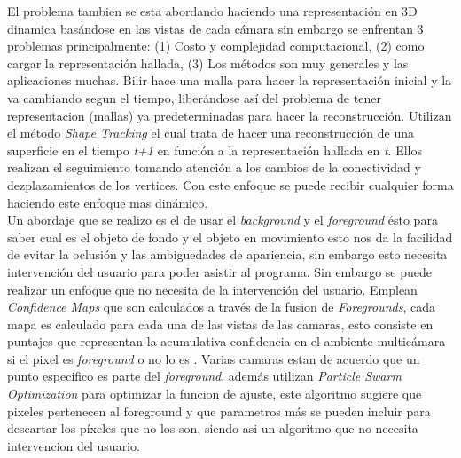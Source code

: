 El problema tambien se esta abordando haciendo una representaci\'on en 3D dinamica bas\'andose en las vistas de cada c\'amara sin embargo se enfrentan 3 problemas principalmente: (1) Costo y complejidad computacional, (2) como cargar la representaci\'on hallada, (3) Los m\'etodos son muy generales y las aplicaciones muchas. Bilir hace una malla para hacer la representaci\'on inicial y la va cambiando segun el tiempo, liber\'andose as\'i del problema de tener representacion (mallas) ya predeterminadas para hacer la reconstrucci\'on. Utilizan el m\'etodo \textit{Shape Tracking} el cual trata de hacer una reconstrucci\'on de una superficie en el tiempo \emph{t+1} en funci\'on a la representaci\'on hallada en \emph{t}. Ellos realizan el seguimiento tomando atenci\'on a los cambios de la conectividad y dezplazamientos   de los vertices. Con este enfoque se puede recibir cualquier forma haciendo este enfoque mas din\'amico.\cite{Bilir_art}\\
Un abordaje que se realizo es el de usar el \textit{background} y el \textit{foreground} \'esto para saber cual es el objeto de fondo y el objeto en movimiento esto nos da la facilidad de evitar la oclusi\'on y las ambiguedades de apariencia, sin embargo esto necesita intervenci\'on del usuario para poder asistir al programa. Sin embargo se puede realizar un enfoque que no necesita de la intervenci\'on del usuario. Emplean \textit{Confidence Maps} que son calculados a trav\'es de la fusion de \textit{Foregrounds}, cada mapa es calculado para cada una de las vistas de las camaras, esto consiste en puntajes que representan la acumulativa confidencia en el ambiente multic\'amara si el pixel es \textit{foreground} o no lo es . Varias camaras estan de acuerdo que un punto especifico es parte del \textit{foreground}, adem\'as utilizan \textit{Particle Swarm Optimization } para optimizar la funcion de ajuste, este algoritmo sugiere que pixeles pertenecen al foreground y que parametros m\'as se pueden incluir para descartar los p\'ixeles que no los son, siendo asi un algoritmo que no necesita intervencion del usuario\cite {Greek_art}.